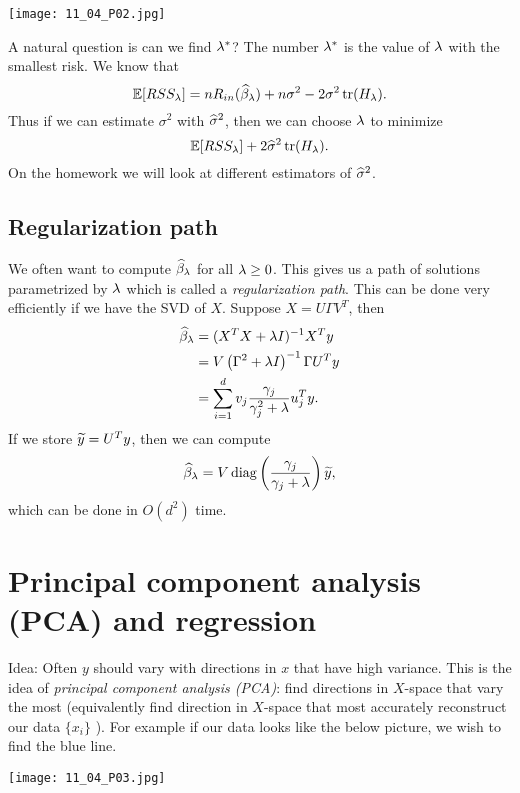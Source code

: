 \begin{center}
    \texttt{[image: 11\_04\_P02.jpg]}
\end{center}
A natural question is can we find $\lambda^*$? The number $\lambda^*$ is the value of $\lambda$ with the smallest risk. We know that 
\[{\mathbb{E}}[RSS_\lambda] = nR_{in}(\widehat{\beta}_\lambda) +n\sigma^2 -2\sigma^2 \operatorname*{tr}(H_\lambda). \]
Thus if we can estimate $\sigma^2$ with $\widehat{\sigma}^2$, then we can choose $\lambda$ to minimize
\[{\mathbb{E}}[RSS_\lambda] + 2\widehat{\sigma}^2 \operatorname*{tr}(H_\lambda).\]
On the homework we will look at different estimators of $\widehat{\sigma}^2$.

\subsection{Regularization path}
We often want to compute $\widehat{\beta}_\lambda$ for all $\lambda \ge 0$. This gives us a path of solutions parametrized by $\lambda$ which is called a \emph{regularization path}. This can be done very efficiently if we have the SVD of $X$. Suppose $X=U\Gamma V^T$, then
\begin{align*}
    \widehat{\beta}_\lambda &= (X^TX+\lambda I)^{-1} X^T y \\
    &= V\left(\Gamma^2 +\lambda I\right)^{-1}\Gamma U^T y\\
    &=\sum_{i=1}^d v_j \frac{\gamma_j}{\gamma_j^2+\lambda}u_j^T y.
\end{align*}
If we store $\widetilde{y} = U^Ty$, then we can compute
\[\widehat{\beta}_\lambda = V\operatorname*{diag}\left(\frac{\gamma_j}{\gamma_j+\lambda}\right)\widetilde{y}, \]
which can be done in $O(d^2)$ time.
\section{Principal component analysis (PCA) and regression}
Idea: Often $y$ should vary with directions in $x$ that have high variance. This is the idea of \emph{principal component analysis (PCA)}: find directions in $X$-space that vary the most (equivalently find direction in $X$-space that most accurately reconstruct our data $\{x_i\}$ ). For example if our data looks like the below picture, we wish to find the blue line.

\begin{center}
    \texttt{[image: 11\_04\_P03.jpg]}
\end{center}

